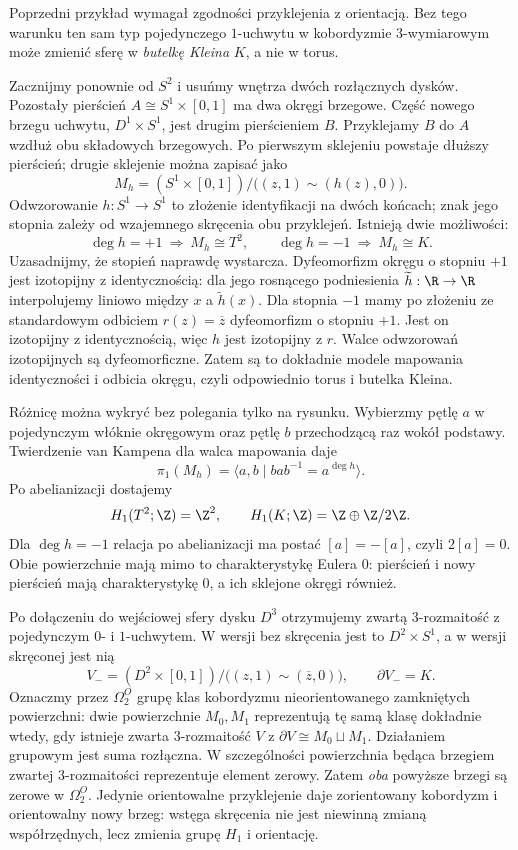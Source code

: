 \begin{przyklad}
\label{prz:skrecony-uchwyt-klein-24}
Poprzedni przykład wymagał zgodności przyklejenia z orientacją.
Bez tego warunku ten sam typ pojedynczego $1$-uchwytu
w kobordyzmie $3$-wymiarowym może zmienić sferę
w \emph{butelkę Kleina} $K$, a nie w torus.

Zacznijmy ponownie od $S^2$ i usuńmy wnętrza dwóch
rozłącznych dysków. Pozostały pierścień
$A\cong S^1\times[0,1]$ ma dwa okręgi brzegowe.
Część nowego brzegu uchwytu, $D^1\times S^1$,
jest drugim pierścieniem $B$.
Przyklejamy $B$ do $A$ wzdłuż obu składowych brzegowych.
Po pierwszym sklejeniu powstaje dłuższy pierścień;
drugie sklejenie można zapisać jako
\[
 M_h=(S^1\times[0,1])/
       \bigl((z,1)\sim(h(z),0)\bigr).
\]
Odwzorowanie $h:S^1\to S^1$ to złożenie
identyfikacji na dwóch końcach; znak jego stopnia
zależy od wzajemnego skręcenia obu przyklejeń.
Istnieją dwie możliwości:
\[
 \deg h=+1\ \Longrightarrow\ M_h\cong T^2,
 \qquad
 \deg h=-1\ \Longrightarrow\ M_h\cong K.
\]
Uzasadnijmy, że stopień naprawdę wystarcza.
Dyfeomorfizm okręgu o stopniu $+1$ jest izotopijny
z identycznością: dla jego rosnącego podniesienia
$\widetilde h:\R\to\R$ interpolujemy liniowo
między $x$ a $\widetilde h(x)$.
Dla stopnia $-1$ mamy po złożeniu ze
standardowym odbiciem $r(z)=\overline z$
dyfeomorfizm o stopniu $+1$. Jest on
izotopijny z identycznością, więc $h$ jest
izotopijny z $r$. Walce odwzorowań izotopijnych
są dyfeomorficzne. Zatem są to dokładnie
modele mapowania identyczności i odbicia okręgu,
czyli odpowiednio torus i butelka Kleina.

Różnicę można wykryć bez polegania tylko na rysunku.
Wybierzmy pętlę $a$ w pojedynczym włóknie okręgowym
oraz pętlę $b$ przechodzącą raz wokół podstawy.
Twierdzenie van Kampena dla walca mapowania daje
\[
 \pi_1(M_h)=
 \langle a,b\mid bab^{-1}=a^{\deg h}\rangle.
\]
Po abelianizacji dostajemy
\[
 H_1(T^2;\Z)=\Z^2,\qquad
 H_1(K;\Z)=\Z\oplus\Z/2\Z.
\]
Dla $\deg h=-1$ relacja po abelianizacji
ma postać $[a]=-[a]$, czyli $2[a]=0$.
Obie powierzchnie mają mimo to charakterystykę
Eulera $0$: pierścień i nowy pierścień mają
charakterystykę $0$, a ich sklejone okręgi również.

Po dołączeniu do wejściowej sfery dysku $D^3$
otrzymujemy zwartą $3$-rozmaitość
z pojedynczym $0$- i $1$-uchwytem.
W wersji bez skręcenia jest to
$D^2\times S^1$, a w wersji skręconej
jest nią
\[
 V_-=(D^2\times[0,1])/
    \bigl((z,1)\sim(\overline z,0)\bigr),
 \qquad \partial V_-=K.
\]
Oznaczmy przez $\Omega_2^O$ grupę klas kobordyzmu
nieorientowanego zamkniętych powierzchni: dwie
powierzchnie $M_0,M_1$ reprezentują tę samą klasę
dokładnie wtedy, gdy istnieje zwarta $3$-rozmaitość $V$
z $\partial V\cong M_0\sqcup M_1$.
Działaniem grupowym jest suma rozłączna.
W szczególności powierzchnia będąca brzegiem zwartej
$3$-rozmaitości reprezentuje element zerowy.
Zatem \emph{oba} powyższe brzegi są zerowe w $\Omega_2^O$.
Jedynie orientowalne przyklejenie daje
zorientowany kobordyzm i orientowalny nowy brzeg:
wstęga skręcenia nie jest niewinną zmianą
współrzędnych, lecz zmienia grupę $H_1$ i orientację.
\end{przyklad}

